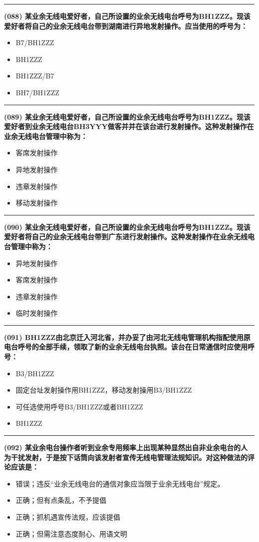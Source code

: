 \documentclass[twocolumn]{ctexart}  %
\begin{document}
\noindent\rule{0.5\textwidth}{1pt}
\heiti \textbf{(088) 某业余无线电爱好者，自己所设置的业余无线电台呼号为BH1ZZZ。现该爱好者将自己的业余无线电台带到湖南进行异地发射操作。应当使用的呼号为：} \songti {\color{gray} [LK0086] }
\begin{itemize}
	\item  B7/BH1ZZZ
	\item  BH1ZZZ
	\item  BH1ZZZ/B7
	\item  BH7/BH1ZZZ
\end{itemize}


\noindent\rule{0.5\textwidth}{1pt}
\heiti \textbf{(089) 某业余无线电爱好者，自己所设置的业余无线电台呼号为BH1ZZZ。现该爱好者到业余无线电台BH3YYY做客并并在该台进行发射操作。这种发射操作在业余无线电台管理中称为：} \songti {\color{gray} [LK0087] }
\begin{itemize}
	\item  客席发射操作
	\item  异地发射操作
	\item  违章发射操作
	\item  移动发射操作
\end{itemize}


\noindent\rule{0.5\textwidth}{1pt}
\heiti \textbf{(090) 某业余无线电爱好者，自己所设置的业余无线电台呼号为BH1ZZZ。现该爱好者将自己的业余无线电台带到广东进行发射操作。这种发射操作在业余无线电台管理中称为：} \songti {\color{gray} [LK0088] }
\begin{itemize}
	\item  异地发射操作
	\item  客席发射操作
	\item  违章发射操作
	\item  临时发射操作
\end{itemize}


\noindent\rule{0.5\textwidth}{1pt}
\heiti \textbf{(091) BH1ZZZ由北京迁入河北省，并办妥了由河北无线电管理机构指配使用原电台呼号的全部手续，领取了新的业余无线电台执照。该台在日常通信时应使用呼号：} \songti {\color{gray} [LK0093] }
\begin{itemize}
	\item  B3/BH1ZZZ
	\item  固定台址发射操作用BH1ZZZ，移动发射操用B3/BH1ZZZ
	\item  可任选使用呼号B3/BH1ZZZ或者BH1ZZZ
	\item  BH1ZZZ
\end{itemize}


\noindent\rule{0.5\textwidth}{1pt}
\heiti \textbf{(092) 某业余电台操作者听到业余专用频率上出现某种显然出自非业余电台的人为干扰发射，于是按下话筒向该发射者宣传无线电管理法规知识。对这种做法的评论应该是：} \songti {\color{gray} [LK0056] }
\begin{itemize}
	\item  错误；违反“业余无线电台的通信对象应当限于业余无线电台”规定。
	\item  正确；但有点条乱，不予提倡
	\item  正确；抓机遇宣传法规，应该提倡
	\item  正确；但需注意态度耐心、用语文明
\end{itemize}
\end{document}
